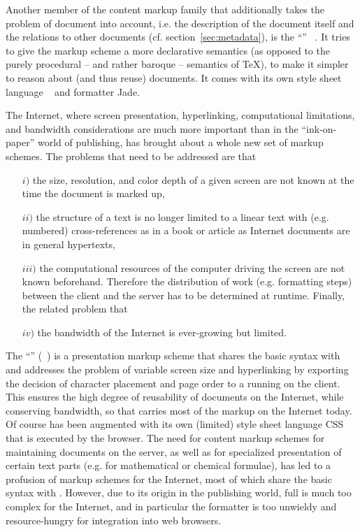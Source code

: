 Another member of the content markup family that additionally takes the problem of
document {} into account, i.e.  the description of the document
itself and the relations to other documents (cf. section~\ref{sec:metadata}), is
the ``{}''
{\sgml}~\cite{Goldfarb:sgml90}.  It tries to give the markup scheme a more
declarative semantics (as opposed to the purely procedural -- and rather baroque
-- semantics of {\TeX}), to make it simpler to reason about (and thus reuse)
documents. It comes with its own style sheet language
{\dsssl{}}~\cite{DuCharme:fddsj97} and formatter Jade.

The Internet, where screen presentation, hyperlinking, computational limitations,
and bandwidth considerations are much more important than in the ``ink-on-paper''
world of publishing, has brought about a whole new set of markup schemes. The
problems that need to be addressed are that 
\begin{enumerate}
\item[$i)$] the size, resolution, and color depth of a given screen are not known
  at the time the document is marked up,
\item[$ii)$] the structure of a text is no longer limited to a linear text with
  (e.g. numbered) cross-references as in a book or article as Internet documents
  are in general hypertexts,
\item [$iii)$] the computational resources of the computer driving the screen are
  not known beforehand. Therefore the distribution of work (e.g. formatting steps)
  between the client and the server has to be determined at runtime. Finally, the
  related problem that
\item[$iv)$] the bandwidth of the Internet is ever-growing but limited.
\end{enumerate}

The ``{}''
({\html}~\cite{RagHor:html98}) is a presentation markup scheme
that shares the basic syntax with {\sgml} and addresses the problem of variable
screen size and hyperlinking by exporting the decision of character placement and
page order to a {} running on the client.  This ensures the high
degree of reusability of documents on the Internet, while conserving bandwidth, so
that {\html} carries most of the markup on the Internet today. Of course {\html}
has been augmented with its own (limited) style sheet language
{CSS}~\cite{BosHak:css98} that is executed by the browser. The need
for content markup schemes for maintaining documents on the server, as well as for
specialized presentation of certain text parts (e.g. for mathematical or chemical
formulae), has led to a profusion of markup schemes for the Internet, most of
which share the basic {\sgml} syntax with {\html}. However, due to its origin in
the publishing world, full {\sgml} is much too complex for the Internet, and in
particular the {\dsssl{}} formatter is too unwieldy and
resource-hungry for integration into web browsers.

